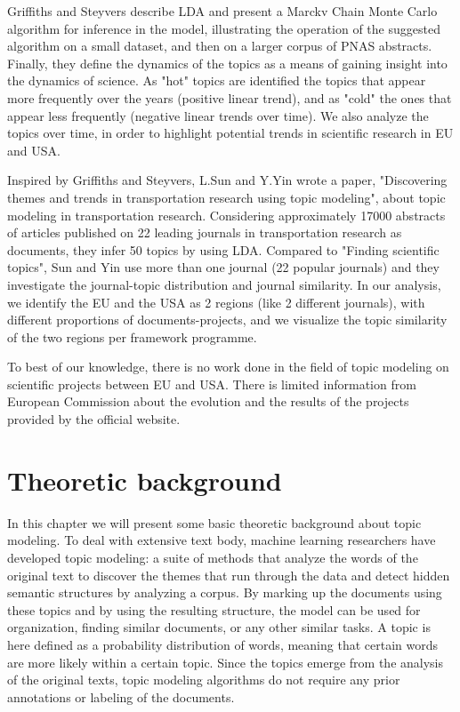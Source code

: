 \documentclass[12pt]{report}
\begin{document}
Griffiths and Steyvers describe LDA and present a Marckv Chain Monte Carlo
algorithm for inference in the model, illustrating the operation of the
suggested algorithm on a small dataset, and then on a larger corpus of PNAS
abstracts. Finally, they define the dynamics of the topics as a means of gaining
insight into the dynamics of science. As "hot" topics are identified the topics
that appear more frequently over the years (positive linear trend), and as
"cold" the ones that appear less frequently (negative linear trends over time).
We also analyze the topics over time, in order to highlight potential trends in
scientific research in EU and USA.

Inspired by Griffiths and Steyvers, L.Sun and Y.Yin wrote a paper, "Discovering
themes and trends in transportation research using topic modeling",
\cite{Sun201749} about topic modeling in transportation research. 
Considering approximately 17000 abstracts of articles published on 22 
leading journals in transportation research as documents, they infer 50 
topics by using LDA. Compared to "Finding scientific topics", Sun and 
Yin use more than one journal (22 popular journals) and they
investigate the journal-topic distribution and journal similarity. In our
analysis, we identify the EU and the USA as 2 regions (like 2 different journals),
with different proportions of documents-projects, and we visualize the topic
similarity of the two regions per framework programme.

To best of our knowledge, there is no work done in the field of topic modeling
on scientific projects between EU and USA. There is limited information from
European Commission about the evolution and the results of the projects provided
by the official website.


\section{Theoretic background}

In this chapter we will present some basic theoretic background about topic
modeling. To deal with extensive text body, machine learning researchers have
developed topic modeling: a suite of methods that analyze the words of the
original text to discover the themes that run through the data and detect
hidden semantic structures by analyzing a corpus. By marking up the documents
using these topics and by using the resulting structure, the model can be used
for organization, finding similar documents, or any other similar tasks. A
topic is here defined as a probability distribution of words, meaning that
certain words are more likely within a certain topic. Since the topics emerge
from the analysis of the original texts, topic modeling algorithms do not
require any prior annotations or labeling of the documents.\cite{Blei11introductionto}
\end{document}
